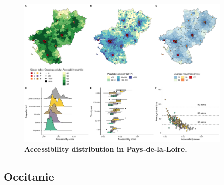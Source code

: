 \begin{figure}[H]
    \includegraphics[width=0.9\textwidth]{images/camion/region_accessibility/accessibility_Pays-de-la-Loire.png}
    \centering
    \caption{
        \textbf{Accessibility distribution in Pays-de-la-Loire.}
    }
\end{figure}

\subsection*{Occitanie}

